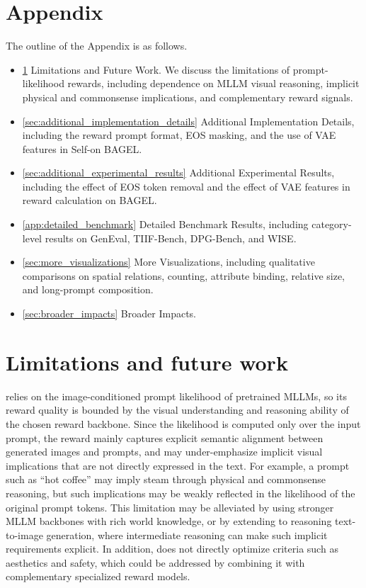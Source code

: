 \newpage
\appendix
\setcounter{page}{1}

\section*{\textbf{Appendix}}

\renewcommand{\subsectionautorefname}{Appendix}
\renewcommand{\sectionautorefname}{Appendix}

The outline of the Appendix is as follows.
\begin{itemize}[leftmargin=*, itemsep=2pt, topsep=2pt]
\item \ref{sec:app_limitations} Limitations and Future Work. We discuss the limitations of prompt-likelihood rewards, including dependence on MLLM visual reasoning, implicit physical and commonsense implications, and complementary reward signals.
\item \ref{sec:additional_implementation_details} Additional Implementation Details, including the reward prompt format, EOS masking, and the use of VAE features in Self-\method on BAGEL.
\item \ref{sec:additional_experimental_results} Additional Experimental Results, including the effect of EOS token removal and the effect of VAE features in reward calculation on BAGEL.

\item \ref{app:detailed_benchmark} Detailed Benchmark Results, including category-level results on GenEval, TIIF-Bench, DPG-Bench, and WISE.
\item \ref{sec:more_visualizations} More Visualizations, including qualitative comparisons on spatial relations, counting, attribute binding, relative size, and long-prompt composition.
\item \ref{sec:broader_impacts} Broader Impacts.
\end{itemize}


\section{Limitations and future work}
\label{sec:app_limitations}
\method relies on the image-conditioned prompt likelihood of pretrained MLLMs, 
so its reward quality is bounded by the visual understanding and reasoning ability of the chosen reward backbone. 
Since the likelihood is computed only over the input prompt, the reward mainly captures explicit semantic alignment between generated images and prompts, 
and may under-emphasize implicit visual implications that are not directly expressed in the text. 
For example, a prompt such as ``hot coffee'' may imply steam through physical and commonsense reasoning, 
but such implications may be weakly reflected in the likelihood of the original prompt tokens. 
This limitation may be alleviated by using stronger MLLM backbones with rich world knowledge, 
or by extending \method to reasoning text-to-image generation, where intermediate reasoning can make such implicit requirements explicit. 
In addition, \method does not directly optimize criteria such as aesthetics and safety, 
which could be addressed by combining it with complementary specialized reward models. 

